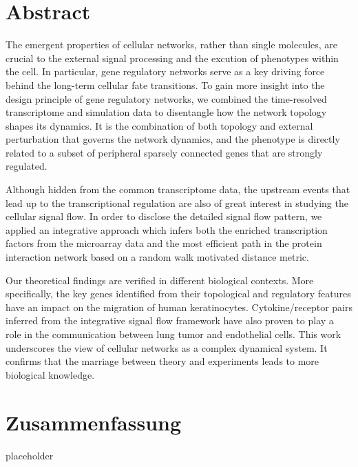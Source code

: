 \chapter*{Abstract}


The emergent properties of cellular networks, rather than single molecules, 
are crucial to the external signal processing and the excution of phenotypes
within the cell. In particular, gene regulatory networks serve as a key
driving force behind the long-term cellular fate transitions. To gain more
insight into the design principle of gene regulatory networks, we combined
the time-resolved transcriptome and simulation data to disentangle how the
network topology shapes its dynamics. It is the combination of both topology
and external perturbation that governs the network dynamics, and 
the phenotype is directly related to a subset of
peripheral sparsely connected genes that are strongly regulated. 

Although hidden from the common transcriptome data, 
the upstream events that lead up to the 
transcriptional regulation are also of great interest in studying the 
cellular signal flow. In order to disclose the detailed signal flow pattern,
we applied an integrative approach which infers both the enriched 
transcription factors from the microarray data and the most efficient path
in the protein interaction network based on a random walk motivated distance
metric.

Our theoretical findings are verified in different biological contexts. More
specifically, the key genes identified from their topological and regulatory
features have an impact on the migration of human keratinocytes. 
Cytokine/receptor pairs inferred from the integrative signal flow framework
have also proven to play a role in the communication between lung tumor
and endothelial cells. This work underscores the view of
cellular networks as a complex dynamical system.
It confirms that the marriage between theory
and experiments leads to more biological knowledge.

\chapter*{Zusammenfassung}


placeholder


